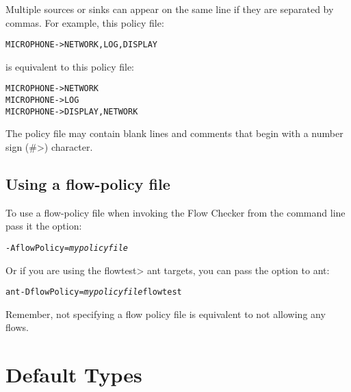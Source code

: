Multiple sources or sinks can appear on the same line if they are separated by commas. 
For example,
this policy file:
\begin{alltt}
   MICROPHONE -> NETWORK, LOG, DISPLAY
\end{alltt}
is equivalent to this policy file:
\begin{alltt}
   MICROPHONE -> NETWORK
   MICROPHONE -> LOG
   MICROPHONE -> DISPLAY, NETWORK
\end{alltt}

The policy file may contain blank lines and comments that begin with 
a number sign (\<\#>) character.



\subsection{Using a flow-policy file}
To use a flow-policy file when invoking the Flow Checker from the
command line pass it the option:
\begin{alltt}
-AflowPolicy=\emph{mypolicyfile}
\end{alltt}

Or if you are using the \<flowtest> ant targets, you can pass the option to ant:
\begin{alltt}
ant -DflowPolicy=\emph{mypolicyfile} flowtest
\end{alltt}

Remember, not specifying a flow policy file is equivalent to not
allowing any flows.






\section{Default Types\label{flow-defaults}}

